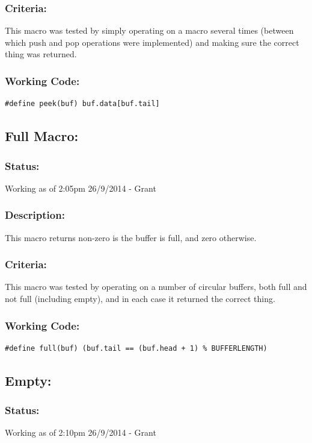 \documentclass[]{report}
\begin{document}
\subsubsection{Criteria:}
This macro was tested by simply operating on a macro several times (between which push and pop operations were implemented) and making sure the correct thing was returned.

\subsubsection{Working Code:}
\begin{lstlisting}
#define peek(buf) buf.data[buf.tail]
\end{lstlisting}

\subsection{Full Macro:}
\subsubsection{Status:}
Working as of 2:05pm 26/9/2014 - Grant

\subsubsection{Description:}
This macro returns non-zero is the buffer is full, and zero otherwise.

\subsubsection{Criteria:}
This macro was tested by operating on a number of circular buffers, both full and not full (including empty), and in each case it returned the correct thing.

\subsubsection{Working Code:}
\begin{lstlisting}
#define full(buf) (buf.tail == (buf.head + 1) % BUFFERLENGTH)
\end{lstlisting}

\subsection{Empty:}
\subsubsection{Status:}
Working as of 2:10pm 26/9/2014 - Grant
\end{document}
